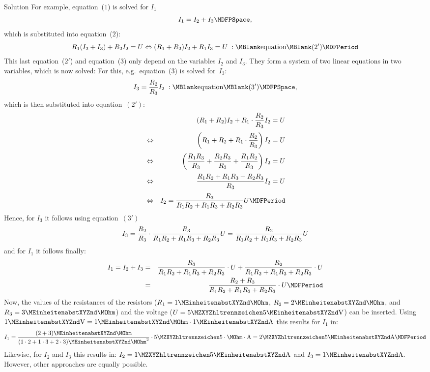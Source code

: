 \begin{MExercises}
\begin{MExercise}
\begin{MHint}{Solution}
For example, equation~($1$) is solved for $I_1$
$$I_1 = I_2 + I_3 \MDFPSpace ,$$
which is substituted into equation~($2$):
$$R_1 (I_2 + I_3) + R_2 I_2 = U \Leftrightarrow (R_1 + R_2) I_2 + R_1 I_3 = U \; : \MBlank\mbox{equation}\MBlank (2') \MDFPeriod$$
This last equation~($2'$) and equation~($3$) only depend on
the variables $I_2$ and $I_3$. They form a system of two linear equations in two variables, 
which is now solved: For this, e.g.\ equation~($3$) is solved for~$I_3$:
$$I_3 = \Mdfrac{R_2}{R_3} I_2 \; : \MBlank\mbox{equation}\MBlank (3') \MDFPSpace ,$$
which is then substituted into equation~$(2')$:
\begin{eqnarray*}
& & (R_1 + R_2) I_2 + R_1 \cdot \Mdfrac{R_2}{R_3} I_2 = U \\[.5ex]
& \Leftrightarrow & \left( R_1 + R_2 + R_1 \cdot \Mdfrac{R_2}{R_3} \right) I_2 = U \\[.5ex]
& \Leftrightarrow & \left( \Mdfrac{R_1 R_3}{R_3} + \Mdfrac{R_2 R_3}{R_3} + \Mdfrac{R_1 R_2}{R_3} \right) I_2 = U \\[.5ex]
& \Leftrightarrow & \Mdfrac{R_1 R_2 + R_1 R_3 + R_2 R_3}{R_3} I_2 = U \\[.5ex]
& \Leftrightarrow & I_2 = \Mdfrac{R_3}{R_1 R_2 + R_1 R_3 + R_2 R_3} U \MDFPeriod
\end{eqnarray*}
Hence, for $I_3$ it follows using equation~$(3')$
$$I_3 = \dfrac{R_2}{R_3} \cdot \dfrac{R_3}{R_1 R_2 + R_1 R_3 + R_2 R_3} U = \dfrac{R_2}{R_1 R_2 + R_1 R_3 + R_2 R_3} U$$
and for $I_1$ it follows finally:
\begin{eqnarray*}
  I_1 = I_2 + I_3 &=& \Mdfrac{R_3}{R_1 R_2 + R_1 R_3 + R_2 R_3} \cdot U + \Mdfrac{R_2}{R_1 R_2 + R_1 R_3 + R_2 R_3} \cdot U \\
  &=& \Mdfrac{R_2 + R_3}{R_1 R_2 + R_1 R_3 + R_2 R_3} \cdot U \MDFPeriod
\end{eqnarray*}
Now, the values of the resistances of the resistors ($R_1 = 1\MEinheit{}\MOhm$, 
$R_2 = 2\MEinheit{}\MOhm$, and $R_3 = 3\MEinheit{}\MOhm$) and the voltage 
($U = \MZahl{5}{5}\MEinheit{V}$) can be inserted. Using
$1\MEinheit{V} = 1\MEinheit{}\MOhm \cdot 1\MEinheit{A}$ this results for $I_1$ in:
$$I_1 = \Mdfrac{(2 + 3)\MEinheit{}\MOhm}{(1 \cdot 2 + 1 \cdot 3 + 2 \cdot 3)\MEinheit{}\MOhm^2} \cdot \MZahl{5}{5} \cdot \MOhm \cdot \MEinheit[]{A}
= \MZahl{2}{5}\MEinheit{A} \MDFPeriod$$
Likewise, for $I_2$ and $I_3$ this results in: 
$I_2 = \MZahl{1}{5}\MEinheit{A}$ and $I_3 = 1\MEinheit{A}.$\\
However, other approaches are equally possible.
\end{MHint}
\end{MExercise}


\end{MExercises}
